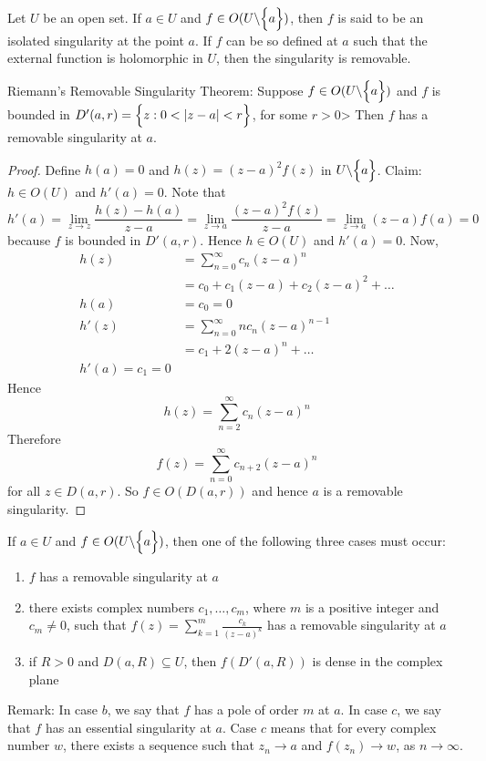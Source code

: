 \documentclass[12pt]{article}
\begin{document}
Let $U$ be an open set. If $a\in U$ and $f \in O(U \backslash \Big\{ a \Big\})$, then $f$ is said to be an isolated singularity at the point $a$. If $f$ can be so defined at $a$ such  that the external function is holomorphic in $U$, then the singularity is removable. 
\begin{theorem} Riemann's Removable Singularity Theorem: Suppose $f \in O(U \backslash \Big\{ a \Big\})$ and $f$ is bounded in $D'(a,r) = \Big\{ z: 0 < \abs{z-a} < r \Big\}$, for some $r>0$> Then $f$ has a removable singularity at $a$. \end{theorem} 
\begin{proof} Define $h(a) = 0$ and $h(z) = (z-a)^2f(z)$ in $U\backslash\Big\{ a \Big\}$. Claim: $h \in O(U)$ and $h'(a) = 0$. Note that $$h'(a) = \lim_{z\to z} \frac{h(z) - h(a)}{z-a} = \lim_{z\to a} \frac{(z-a)^2f(z)}{z-a} = \lim_{z\to a} (z-a)f(a) = 0 $$ because $f$ is bounded in $D'(a,r)$. Hence $h \in O(U)$ and $h'(a) = 0$. Now, $$ \begin{aligned} h(z) &= \sum_{n=0}^\infty c_n(z-a)^n \\ &= c_0 + c_1(z-a) + c_2(z-a)^2 + \dots \\ h(a) &= c_0 = 0 \\ h'(z) &= \sum_{n=0}^\infty nc_n(z-a)^{n-1} \\ &= c_1 + 2(z-a)^n + \dots \\ h'(a) = c_1 = 0 \end{aligned} $$ Hence $$h(z) = \sum_{n=2}^\infty c_n(z-a)^n $$ Therefore $$f(z) = \sum_{n=0}^\infty c_{n+2}(z-a)^n$$ for all $z \in D(a,r)$. So $f \in O(D(a,r))$ and hence $a$ is a removable singularity. \end{proof} 
\begin{theorem} If $a \in U$ and $f \in O(U \backslash\Big\{ a \Big\})$, then one of the following three cases must occur: \begin{enumerate} 
\item $f$ has a removable singularity at $a$ 
\item there exists complex numbers $c_1,\dots,c_m$, where $m$ is a positive integer and $c_m \neq 0$, such that $f(z) = \sum_{k=1}^m \frac{c_k}{(z-a)^k} $ has a removable singularity at $a$ 
\item if $R > 0$ and $D(a,R) \subseteq U$, then $f(D'(a,R))$ is dense in the complex plane \end{enumerate} \end{theorem} 
Remark: In case $b$, we say that $f$ has a pole of order $m$ at $a$. In case $c$, we say that $f$ has an essential singularity at $a$. Case $c$ means that for every complex number $w$, there exists a sequence such that $z_n \to a$ and $f(z_n ) \to w$, as  $n\to\infty$. \\
\end{document}
